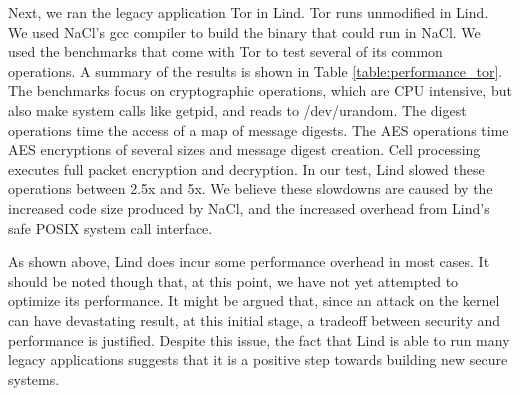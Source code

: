 Next, we ran the legacy application Tor in Lind. Tor runs unmodified in
Lind. We used NaCl's gcc compiler to build the binary that could run in NaCl. 
We used the benchmarks that come with Tor to test several of its common
operations. 
A summary of the results is shown in Table \ref{table:performance_tor}. The
benchmarks focus on cryptographic operations, 
which are CPU intensive, but also make system calls like getpid, and reads to
/dev/urandom.
The digest operations time the access of a map of message digests. 
The AES operations time AES encryptions of several sizes and message 
digest creation. 
Cell processing executes full packet encryption and decryption. In our
test, 
Lind slowed these operations between 2.5x and 5x. We believe these
slowdowns 
are caused by the increased code size produced by NaCl, and the
increased overhead from Lind's safe POSIX system call interface. 

As shown above,  Lind does incur some performance overhead in most cases. 
It should be noted though that, at this point, we have not  yet attempted
to optimize its performance. 
It might be argued that, since an attack on the kernel can have devastating
result, at this initial stage, 
a tradeoff between security and performance is justified. Despite this
issue, 
the fact that Lind is able to run many legacy applications suggests that it
is a positive step towards building new secure systems. 

